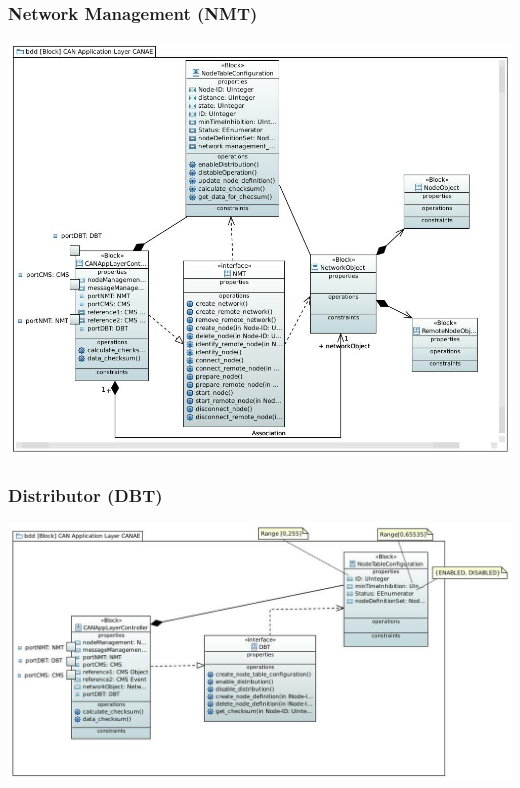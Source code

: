\begin{frame}
	\frametitle{Network Management (NMT)}
	\centering
	\includegraphics[scale=0.25]{images/NMT.JPG}
\end{frame}

\begin{frame}
	\frametitle{Distributor (DBT)}
	\centering
	\includegraphics[scale=0.3]{images/DBT.JPG}
\end{frame}


